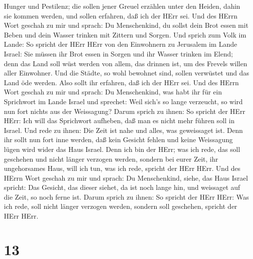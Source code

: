 Hunger und Pestilenz; die sollen jener Greuel erzählen unter den Heiden,
dahin sie kommen werden, und sollen erfahren, daß ich der HErr sei.
 Und des HErrn Wort geschah zu mir und sprach:
 Du Menschenkind, du sollst dein Brot essen mit Beben und
dein Wasser trinken mit Zittern und Sorgen.  Und sprich zum
Volk im Lande: So spricht der HErr HErr von den Einwohnern zu Jerusalem
im Lande Israel: Sie müssen ihr Brot essen in Sorgen und ihr Wasser
trinken im Elend; denn das Land soll wüst werden von allem, das drinnen
ist, um des Frevels willen aller Einwohner.  Und die
Städte, so wohl bewohnet sind, sollen verwüstet und das Land öde werden.
Also sollt ihr erfahren, daß ich der HErr sei.  Und des
HErrn Wort geschah zu mir und sprach:  Du Menschenkind, was
habt ihr für ein Sprichwort im Lande Israel und sprechet: Weil sich's so
lange verzeucht, so wird nun fort nichts aus der Weissagung?
 Darum sprich zu ihnen: So spricht der HErr HErr: Ich will
das Sprichwort aufheben, daß man es nicht mehr führen soll in Israel.
Und rede zu ihnen: Die Zeit ist nahe und alles, was geweissaget ist.
 Denn ihr sollt nun fort inne werden, daß kein Gesicht
fehlen und keine Weissagung lügen wird wider das Haus Israel.
 Denn ich bin der HErr; was ich rede, das soll geschehen
und nicht länger verzogen werden, sondern bei eurer Zeit, ihr
ungehorsames Haus, will ich tun, was ich rede, spricht der HErr HErr.
 Und des HErrn Wort geschah zu mir und sprach:
 Du Menschenkind, siehe, das Haus Israel spricht: Das
Gesicht, das dieser siehet, da ist noch lange hin, und weissaget auf die
Zeit, so noch ferne ist.  Darum sprich zu ihnen: So spricht
der HErr HErr: Was ich rede, soll nicht länger verzogen werden, sondern
soll geschehen, spricht der HErr HErr.

\hypertarget{section-12}{%
\section{13}\label{section-12}}

